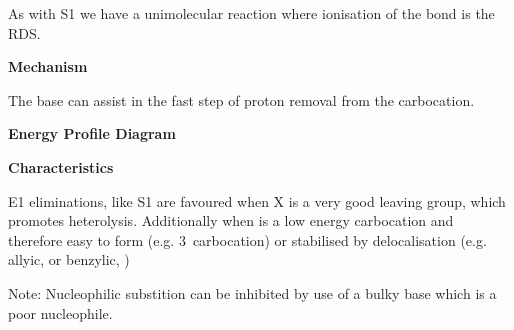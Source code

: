 As with S1 we have a unimolecular reaction where ionisation of the 
bond is the RDS.

\textbf{Mechanism}


The base can assist in the fast step of proton removal from the carbocation.

\textbf{Energy Profile Diagram}


\textbf{Characteristics}

E1 eliminations, like S1 are favoured when X is a very good leaving group,
which promotes heterolysis. Additionally when  is a low energy carbocation
and therefore easy to form (e.g. 3\de\ carbocation) or stabilised by
delocalisation (e.g. allyic,  or benzylic, )

Note: Nucleophilic substition can be inhibited by use of a bulky base which is a
poor nucleophile.